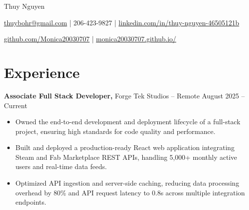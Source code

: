 \documentclass[11pt]{article}       %
\begin{document}
\centerline{\Huge Thuy Nguyen}

\vspace{5pt}

\centerline{\href{mailto:thuybohr@gmail.com}{thuybohr@gmail.com} | 206-423-9827 |
\href{https://www.linkedin.com/in/thuy-nguyen-46505121b/}{linkedin.com/in/thuy-nguyen-46505121b}}

\centerline{\href{https://github.com/Monica20030707}{github.com/Monica20030707} | 
\href{https://monica20030707.github.io/}{monica20030707.github.io/}} 

\vspace{-9pt}

\section*{Experience}

\textbf{Associate Full Stack Developer,} {Forge Tek Studios} -- Remote \hfill August 2025 -- Current 
\vspace{-9pt}
\begin{itemize}
  \item Owned the end-to-end development and deployment lifecycle of a full-stack project, ensuring high standards for code quality and performance.
  \item Built and deployed a production-ready React web application integrating Steam and Fab Marketplace REST APIs, handling 5,000+ monthly active users and real-time data feeds.
  \item Optimized API ingestion and server-side caching, reducing data processing overhead by 80\% and API request latency to 0.8s across multiple integration endpoints.
\end{itemize}
\end{document}

